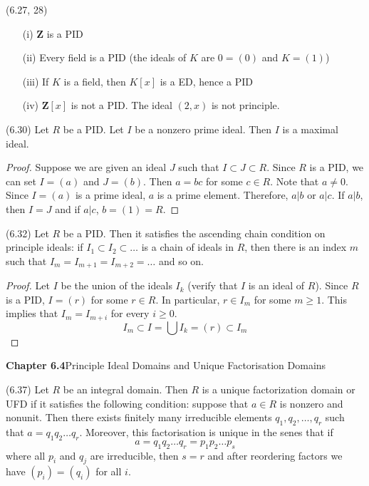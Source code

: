 \vspace{2ex}
\begin{ex}
(6.27, 28)
\begin{itemize}
\item[(i)] ${\bm Z}$ is a PID
\item[(ii)] Every field is a PID (the ideals of $K$ are $0=(0)$ and $K=(1)$)
\item[(iii)] If $K$ is a field, then $K[x]$ is a ED, hence  a PID
\item[(iv)] ${\bm Z}[x]$ is not a PID. The ideal $(2,x)$ is not principle. 
\end{itemize}
\end{ex}
\vspace{2ex}
\begin{prop}
(6.30) Let $R$ be a PID. Let $I$ be a nonzero prime ideal. Then $I$ is a maximal ideal. 
\end{prop}
\vspace{2ex}
\begin{proof}
Suppose we are given an ideal $J$ such that $I\subset J\subset R$. Since $R$ is a PID, we can set $I=(a)$ and $J=(b)$. Then $a=bc$ for some $c\in R$. Note that $a\ne 0$. Since $I=(a)$ is a prime ideal, $a$ is a prime element. Therefore, $a|b$ or $a|c$. If $a|b$, then $I=J$ and if $a|c$, $b=(1)=R$. 
\end{proof}
\vspace{2ex}
\begin{prop}
(6.32) Let $R$ be a PID. Then it satisfies the ascending chain condition on principle ideals: if $I_1\subset I_2\subset \ldots $ is a chain of ideals in $R$, then there is an index $m$ such that $I_{m}=I_{m+1}=I_{m+2}=\ldots $ and so on.
\end{prop}
\vspace{2ex}
\begin{proof}
Let $I$ be the union of the ideals $I_{k}$ (verify that $I$ is an ideal of $R$). Since $R$ is a PID, $I=(r)$ for some $r\in R$. In particular, $r\in I_{m}$ for some $m\geq 1$. This implies that $I_{m}=I_{m+i}$ for every $i\geq 0$. 
\[I_{m}\subset I=\bigcup I_{k}=(r)\subset I_{m}\]
\end{proof}
\vspace{2ex}
{\bf Chapter 6.4}\hspace{2ex}Principle Ideal Domains and Unique Factorisation Domains 
\\
\begin{defi}
(6.37) Let $R$ be an integral domain. Then $R$ is a unique factorization domain or UFD if it satisfies the following condition: suppose that $a\in R$ is nonzero and nonunit. Then there exists finitely many irreducible elements $q_1,q_2,\ldots ,q_{r}$ such that $a=q_1q_2\ldots q_{r}$. Moreover, this factorisation is unique in the senes that if 
\[a=q_1q_2\ldots q_{r}=p_1p_2\ldots p_{s}\]
where all $p_{i}$ and $q_{j}$ are irreducible, then $s=r$ and after reordering factors we have $(p_{i})=(q_{i})$ for all $i$. 
\end{defi}
